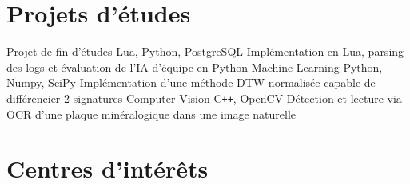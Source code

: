 \documentclass[11pt,a4paper,sans]{moderncv}
\begin{document}
\section{Projets d'études}
	   {Projet de fin d'études}
	   {Lua, Python, PostgreSQL}
	   {}
	   {Implémentation en Lua, parsing des logs et évaluation de l'IA d'équipe en Python}
	   {Machine Learning}
	   {Python, Numpy, SciPy}
	   {}
	   {Implémentation d'une méthode DTW normalisée capable de différencier 2 signatures}
	   {Computer Vision}
	   {C\texttt{++}, OpenCV}
	   {}
	   {Détection et lecture via OCR d'une plaque minéralogique dans une image naturelle}

\section{Centres d'intérêts}
\end{document}
